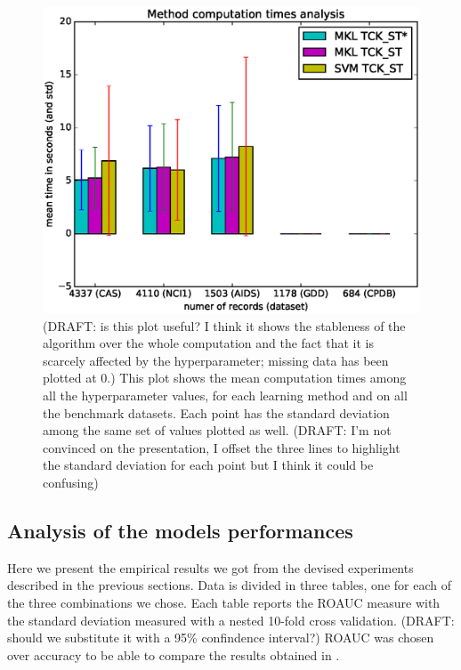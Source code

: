 \begin{figure}[ht]
    \centering
    \includegraphics[scale=0.7]{Figures/method_times_avgstd}
    \caption{(DRAFT: is this plot useful? I think it shows the stableness of the algorithm
        over the whole computation and the fact that it is scarcely affected by the hyperparameter; missing data has been plotted at 0.)
        This plot shows the mean computation times among all the hyperparameter values,
        for each learning method and on all the benchmark datasets.
        Each point has the standard deviation among the same set of values plotted as well.
        (DRAFT: I'm not convinced on the presentation, I offset the three lines to highlight the
        standard deviation for each point but I think it could be confusing)
    }
        \label{fig:meantimes}
\end{figure}

\subsection{Analysis of the models performances}

Here we present the empirical results we got from the devised experiments described
in the previous sections.
Data is divided in three tables, one for each of the three combinations we chose.
Each table reports the ROAUC measure with the standard deviation measured with
a nested 10-fold cross validation. (DRAFT: should we substitute it with a 95\% confindence interval?)
ROAUC was chosen over accuracy to be able to compare the results obtained in \cite{gmkl}.

